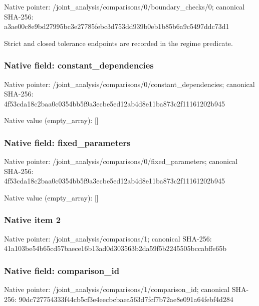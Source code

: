 \documentclass[10pt,a4paper]{article}
\begin{document}
Native pointer: /joint\_analysis/comparis\allowbreak{}ons/0/boundary\_checks/0; canonical SHA-256: a3ae00c8e9bd27995bc3e277\allowbreak{}85febc3d753dd939b0eb1b85\allowbreak{}b6a9c5497ddc73d1


Strict and closed tolerance endpoints are recorded in the regime predicate.


\subsubsection{Native field: constant\_dependencies}


Native pointer: /joint\_analysis/comparis\allowbreak{}ons/0/constant\_dependenc\allowbreak{}ies; canonical SHA-256: 4f53cda18c2baa0c0354bb5f\allowbreak{}9a3ecbe5ed12ab4d8e11ba87\allowbreak{}3c2f11161202b945



Native value (empty\_array): []



\subsubsection{Native field: fixed\_parameters}


Native pointer: /joint\_analysis/comparis\allowbreak{}ons/0/fixed\_parameters; canonical SHA-256: 4f53cda18c2baa0c0354bb5f\allowbreak{}9a3ecbe5ed12ab4d8e11ba87\allowbreak{}3c2f11161202b945



Native value (empty\_array): []



\subsubsection{Native item 2}


Native pointer: /joint\_analysis/comparisons/1; canonical SHA-256: 41a103be54b65cd57baece16\allowbreak{}b13ad0d303563b2da59f5b22\allowbreak{}45505bccabffe65b



\subsubsection{Native field: comparison\_id}


Native pointer: /joint\_analysis/comparis\allowbreak{}ons/1/comparison\_id; canonical SHA-256: 90dc727754333f44cb5cf3e4\allowbreak{}eecbcbaea563d7fcf7b72ae8\allowbreak{}e091a64febf4d284
\end{document}
